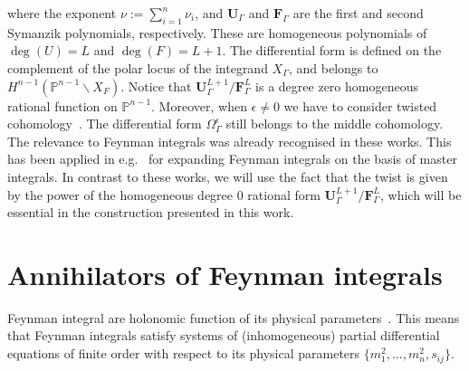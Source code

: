 \documentclass[a4paper,12pt]{article}
\numberwithin{equation}{section}
\numberwithin{figure}{section}
\begin{document}
%
where the exponent $\nu:=\sum_{i=1}^n \nu_i$, and $\textbf{U}_\Gamma$ and $\textbf{F}_\Gamma$ are the first and second Symanzik
polynomials, 
%
respectively. These are homogeneous  polynomials of
$\deg(U)=L$ and $\deg(F)=L+1$. 
%
%
The differential form is defined on the complement of the polar locus
of the integrand $X_\Gamma$, and belongs to $H^{n-1}( \mathbb
P^{n-1}\backslash X_F)$. Notice that   $\textbf{U}_\Gamma^{L+1}/\textbf{F}_\Gamma^L$ is a degree
zero homogeneous rational function on $\mathbb
P^{n-1}$. Moreover,  when $\epsilon\neq0$ we have to consider twisted
cohomology~\cite{Aomoto1,Aomoto,Aomoto_1982,AomotoBook}. The differential form
$\Omega_\Gamma^\epsilon$ still belongs to the middle cohomology. The
relevance to Feynman integrals was already recognised in these works. 
This has been applied in
e.g.~\cite{Mizera:2017rqa,Frellesvig:2019uqt,Cacciatori:2021nli}  for
expanding Feynman integrals on the basis of master integrals. In contrast to these works, 
%
we will use
the fact that the twist is given by
the power of the homogeneous degree 0 rational form
$\textbf{U}_\Gamma^{L+1}/\textbf{F}_\Gamma^L$, which will be essential
in the construction presented in this work.


\section{Annihilators of Feynman integrals}
\label{sec:Red}
Feynman integral are holonomic function of its physical parameters~\cite{Kashiwara:1977nf, Bitoun:2017nre, Smirnov:2010hn,Lee:2013hzt}. This means that Feynman integrals satisfy systems of  (inhomogeneous) partial
differential equations of finite order with respect to its physical parameters
$ \{m_1^2,\dots,m_n^2,s_{ij}\}$.
\end{document}

